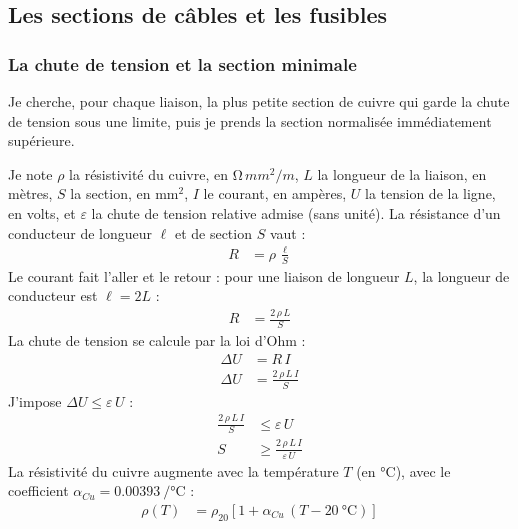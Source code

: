 
\subsection{Les sections de câbles et les fusibles}

\subsubsection*{La chute de tension et la section minimale}

Je cherche, pour chaque liaison, la plus petite section de cuivre qui garde la chute de tension sous une limite, puis je prends la section normalisée immédiatement supérieure.

\begin{demonstration}
Je note $\rho$ la résistivité du cuivre, en $\unit{\ohm\,mm^2/m}$, $L$ la longueur de la liaison, en mètres, $S$ la section, en mm$^2$, $I$ le courant, en ampères, $U$ la tension de la ligne, en volts, et $\varepsilon$ la chute de tension relative admise (sans unité). La résistance d'un conducteur de longueur $\ell$ et de section $S$ vaut :
\begin{align*}
R &= \rho\,\frac{\ell}{S}
\end{align*}
Le courant fait l'aller et le retour : pour une liaison de longueur $L$, la longueur de conducteur est $\ell = 2L$ :
\begin{align*}
R &= \frac{2\,\rho\, L}{S}
\end{align*}
La chute de tension se calcule par la loi d'Ohm :
\begin{align*}
\Delta U &= R\, I\\
\Delta U &= \frac{2\,\rho\, L\, I}{S}
\end{align*}
J'impose $\Delta U \leq \varepsilon\, U$ :
\begin{align*}
\frac{2\,\rho\, L\, I}{S} &\leq \varepsilon\, U\\
S &\geq \frac{2\,\rho\, L\, I}{\varepsilon\, U}
\end{align*}
La résistivité du cuivre augmente avec la température $T$ (en °C), avec le coefficient $\alpha_{Cu} = \qty{0,00393}{/\celsius}$ :
\begin{align*}
\rho(T) &= \rho_{20}\left[1 + \alpha_{Cu}\,(T - \qty{20}{\celsius})\right]
\end{align*}
\end{demonstration}

